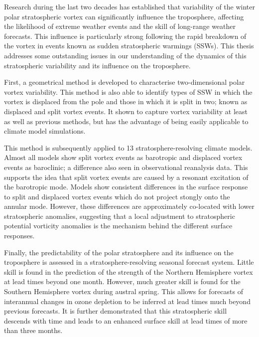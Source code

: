 \begin{abstractseparate}

  Research during the last two decades has established that variability of the
  winter polar stratospheric vortex can significantly influence the troposphere,
  affecting the likelihood of extreme weather events and the skill of long-range
  weather forecasts. This influence is particularly strong following the rapid
  breakdown of the vortex in events known as sudden stratospheric warmings
  (SSWs). This thesis addresses some outstanding issues in our understanding of
  the dynamics of this stratospheric variability and its influence on the
  troposphere.

  First, a geometrical method is developed to characterise two-dimensional polar
  vortex variability. This method is also able to identify types of SSW in which
  the vortex is displaced from the pole and those in which it is split in two;
  known as displaced and split vortex events. It shown to capture vortex
  variability at least as well as previous methods, but has the advantage of
  being easily applicable to climate model simulations. 



  This method is subsequently applied to 13 stratosphere-resolving climate
  models. Almost all models show split vortex events as barotropic and displaced
  vortex events as baroclinic; a difference also seen in observational
  reanalysis data. This supports the idea that split vortex events are caused by
  a resonant excitation of the barotropic mode. Models show consistent
  differences in the surface response to split and displaced vortex events which
  do not project stongly onto the annular mode. However, these differences are
  approximately co-located with lower stratospheric anomalies, suggesting that a
  local adjustment to stratospheric potential vorticity anomalies is the
  mechanism behind the different surface responses.

  Finally, the predictability of the polar stratosphere and its influence on the
  troposphere is assessed in a stratosphere-resolving seasonal forecast
  system. Little skill is found in the prediction of the strength of the
  Northern Hemisphere vortex at lead times beyond one month. However, much
  greater skill is found for the Southern Hemisphere vortex during austral
  spring. This allows for forecasts of interannual changes in ozone depletion to
  be inferred at lead times much beyond previous forecasts. It is further
  demonstrated that this stratospheric skill descends with time and leads to an
  enhanced surface skill at lead times of more than three months. 
 



\end{abstractseparate}

